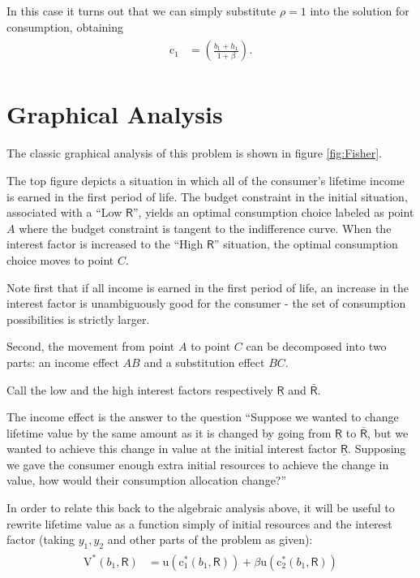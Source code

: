 \documentclass{scrartcl}
\begin{document}
  In this case it turns out that we can simply substitute $\rho=1$ into the solution for consumption, obtaining
  \begin{equation}\begin{gathered}\begin{aligned} \mathrm{c}_{1} & = \left(\frac{\boldsymbol{\mathit{b}}_{1}+\boldsymbol{\mathit{h}}_{1}}{1+\beta}\right).
      \end{aligned}\end{gathered}\end{equation}


  \section{Graphical Analysis}

  The classic graphical analysis of this problem is shown in figure \ref{fig:Fisher}.

  The top figure depicts a situation in which all of the consumer's lifetime income is earned in the first period of life.  The budget constraint in the initial situation, associated with a ``Low $\mathsf{R}$'', yields an optimal consumption choice labeled as point $A$ where the budget constraint is tangent to the indifference curve.  When the interest factor is increased to the ``High $\mathsf{R}$'' situation, the optimal consumption choice moves to point $C$.

  Note first that if all income is earned in the first period of life, an increase in the interest factor is unambiguously good for the consumer - the set of consumption possibilities is strictly larger.

  Second, the movement from point $A$ to point $C$ can be decomposed into two parts: an income effect $AB$ and a substitution effect $BC$.

  Call the low and the high interest factors respectively $\underline{\mathsf{R}}$ and $\bar{\mathsf{R}}$.

  The income effect is the answer to the question ``Suppose we wanted to change lifetime value by the same amount as it is changed by going from $\underline{\mathsf{R}}$ to $\bar{\mathsf{R}}$, but we wanted to achieve this change in value at the initial interest factor $\underline{\mathsf{R}}$.  Supposing we gave the consumer enough extra initial resources to achieve the change in value, how would their consumption allocation change?''

  In order to relate this back to the algebraic analysis above, it will be useful to rewrite lifetime value as a function simply of initial resources and the interest factor (taking ${\boldsymbol{\mathit{y}}_{1},\boldsymbol{\mathit{y}}_{2}}$ and other parts of the problem as given):
  \begin{equation}\begin{gathered}\begin{aligned} \mathrm{V}^{*}(\boldsymbol{\mathit{b}}_{1},\mathsf{R}) & = \mathrm{u}(\mathrm{c}_{1}^{*}(\boldsymbol{\mathit{b}}_{1},\mathsf{R}))+\beta \mathrm{u}(\mathrm{c}_{2}^{*}(\boldsymbol{\mathit{b}}_{1},\mathsf{R}))
      \end{aligned}\end{gathered}\end{equation}
\end{document}
